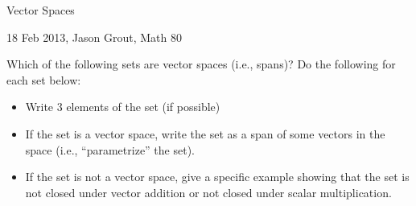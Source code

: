\documentclass[11pt]{article}
\begin{document}
\newcommand{\vecspan}[1]{\mathrm{span}(#1)}
\begin{center}{\centerline\large Vector Spaces}

{\centering\large 18 Feb 2013, Jason Grout, Math 80}
\end{center}
\bigskip

Which of the following sets are vector spaces (i.e., spans)?  Do the following for each set below:

\begin{itemize}
\item Write 3 elements of the set (if possible)
\item If the set is a vector space, write the set as a span of some vectors in the space (i.e., ``parametrize'' the set).  
\item If the set is not a vector space, give a specific example showing that the set is not closed under vector addition or not closed under scalar multiplication.
\end{itemize}
\end{document}
